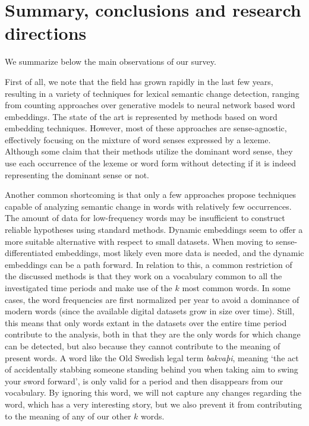 \documentclass[output=paper]{langsci/langscibook}
\begin{document}
\section{Summary, conclusions and research directions}\label{sec:summary}

We summarize below the main observations of our survey. 

First of all, we note that the field has grown rapidly in the last few years, resulting in a variety of techniques for lexical semantic change detection, ranging from counting approaches over generative models to neural network based word embeddings. The state of the art is represented by methods based on word embedding techniques. However, most of these approaches are sense-agnostic, effectively focusing on the mixture of word senses expressed by a lexeme. Although some claim that their methods utilize the dominant word sense, they use each occurrence of the lexeme or word form without detecting if it is indeed representing the dominant sense or not. 

Another common shortcoming is that only a few approaches propose techniques capable of analyzing semantic change in words with relatively few occurrences. The amount of data for low-frequency words may be insufficient to construct reliable hypotheses using standard methods. Dynamic embeddings seem to offer a more suitable alternative with respect to small datasets. 
When moving to sense-differentiated embeddings, most likely even more data is needed, and the dynamic embeddings can be a path forward.
In relation to this, a common restriction of the discussed methods is that they work on a vocabulary common to all the investigated time periods and make use of the $k$ most common words. In some cases, the word frequencies are first normalized per year to avoid a dominance of modern words (since the available digital datasets grow in size over time). Still, this means that only words extant in the datasets over the entire time period contribute to the analysis, both in that they are the only words for which change can be detected, but also because they cannot contribute to the meaning of present words. A word like the Old Swedish legal term \emph{bakvaþi}, meaning `the act of accidentally stabbing someone standing behind you when taking aim to swing your sword forward', is only valid for a period and then disappears from our vocabulary. By ignoring this word, we will not capture any changes regarding the word, which has a very interesting story, but we also prevent it from contributing to the meaning of any of our other $k$ words.
\end{document}

